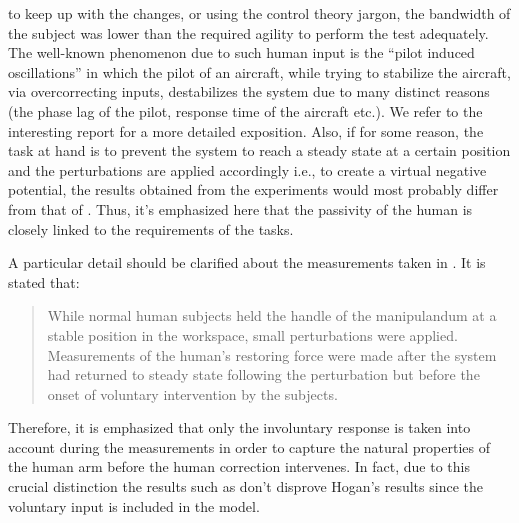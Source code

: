 to keep up with the changes, or using the control theory jargon, the bandwidth of the subject was lower than the required agility to 
perform the test adequately. The well-known phenomenon due to such human input is the \enquote{pilot induced oscillations} in which the 
pilot of an aircraft, while trying to stabilize the aircraft, via overcorrecting inputs, destabilizes the system due to many distinct 
reasons (the phase lag of the pilot, response time of the aircraft etc.). We refer to the interesting report \cite{mcruer} for a more 
detailed exposition. Also, if for some reason, the task at hand is to prevent the system to reach a steady state at a certain position 
and the perturbations are applied accordingly i.e., to create a virtual negative potential, the results obtained from the experiments 
would most probably differ from that of \cite{mussa85}. Thus, it's emphasized here that the passivity of the human is closely linked 
to the requirements of the tasks. 


\begin{rem}\label{rem:filament}
A particular detail should be clarified about the measurements taken in \cite{hogan89}. It is stated that: 
\begin{quote}
While normal human subjects held the handle of the manipulandum at a stable position
in the workspace, small perturbations were applied. Measurements
of the human's restoring force were made after the system
had returned to steady state following the perturbation but before
the onset of voluntary intervention by the subjects.
\end{quote}
Therefore, it is emphasized that only the involuntary response is taken into account during the measurements in order to
capture the natural properties of the human arm before the human correction intervenes. In fact, due to this crucial distinction
the results such as \cite{dyck2013} don't disprove Hogan's results since the voluntary input is included in the model. 
%
%
\end{rem}

